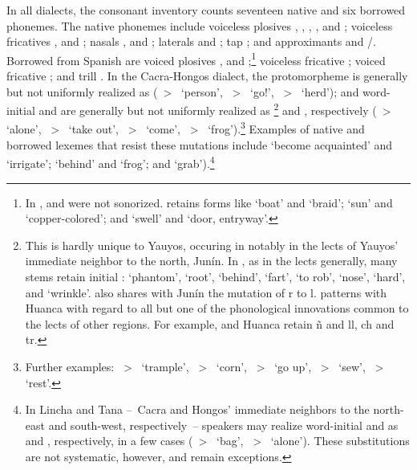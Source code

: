 {In all dialects, the consonant inventory counts seventeen native and six borrowed phonemes. The native phonemes include voiceless plosives , , , ,  and ; voiceless fricatives ,  and ; nasals ,  and ; laterals  and ; tap ; and approximants  and /. Borrowed from Spanish are voiced plosives ,  and ;\footnote{In \SYQ,   and  were not sonorized. \SYQ{} retains \PQ{} forms like  ‘boat’ and  ‘braid’;  ‘sun’ and  ‘copper-colored’; and  ‘swell’ and  ‘door, entryway’.} voiceless fricative ; voiced fricative ; and trill . In the Cacra-Hongos dialect, the protomorpheme  is generally but not uniformly realized as \textipa{[l]} (\textipa{*}~>~ ‘person’, \textipa{*}~>~ ‘go!’, \textipa{*}~>~ ‘herd’); and word-initial  and  are generally but not uniformly realized as \textipa{[h]}\footnote{This is hardly unique to Yauyos, occuring in notably in the lects of Yauyos’ immediate neighbor to the north, Junín. In \CH, as in the \QB{} lects generally, many stems retain initial :  ‘phantom’,  ‘root’,  ‘behind’,  ‘fart’,  ‘to rob’,  ‘nose’,  ‘hard’, and  ‘wrinkle’. \CH{} also shares with Junín the mutation of r to l. \CH{} patterns with Huanca with regard to all but one of the phonological innovations common to the lects of other \QB{} regions. For example, \CH{} and Huanca retain ñ and ll, ch and tr.} and \textipa{[ʃ]}, respectively (\textipa{*}~>~ ‘alone’, \textipa{*}~>~ ‘take out’, \textipa{*}~>~ ‘come’, \textipa{*}~>~ ‘frog’).\footnote{Further examples: ~>~ ‘trample’, ~>~ ‘corn’, ~>~ ‘go up’, ~>~ ‘sew’, ~>~ ‘rest’.} Examples of native and borrowed lexemes that resist these mutations include  ‘become acquainted’ and  ‘irrigate’;  ‘behind’ and  ‘frog’; and  ‘grab’).\footnote{In Lincha and Tana --~Cacra and Hongos’ immediate neighbors to the north-east and south-west, respectively~-- speakers may realize word-initial  and  as \textipa{[l]} and \textipa{[h]}, respectively, in a few cases (\textipa{*}~>~ ‘bag’, \textipa{*}~>~ ‘alone’). These substitutions are not systematic, however, and remain exceptions.}

}
